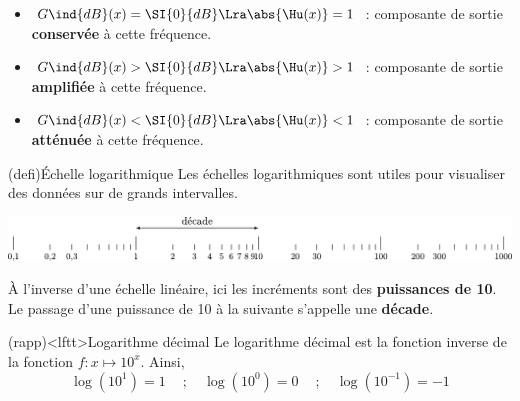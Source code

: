 \documentclass[../../main/main.tex]{subfiles}
\begin{document}
\begin{tcb*}[breakable]
\begin{enumerate}
		      \begin{itemize}
			      \item $G\ind{dB}(x) = \SI{0}{dB} \Lra \abs{\Hu(x)} = 1$~: composante
			            de sortie \textbf{conservée} à cette fréquence.
			      \item $G\ind{dB}(x) > \SI{0}{dB} \Lra \abs{\Hu(x)} > 1$~: composante
			            de sortie \textbf{amplifiée} à cette fréquence.
			      \item $G\ind{dB}(x) < \SI{0}{dB} \Lra \abs{\Hu(x)} < 1$~: composante
			            de sortie \textbf{atténuée} à cette fréquence.
		      \end{itemize}
	\end{enumerate}
\end{tcb*}

\vspace{-10pt}
\begin{tcb}(defi){Échelle logarithmique}
	Les échelles logarithmiques sont utiles pour visualiser des données
	sur de grands intervalles.
	\smallbreak
	\noindent
	\begin{minipage}{\linewidth}
		\centering
		\includegraphics[width=\linewidth]{logscale}
		\label{fig:logscale}
	\end{minipage}
	À l'inverse d'une échelle linéaire, ici les incréments sont des
	\textbf{puissances de 10}. Le passage d'une puissance de 10 à la suivante
	s'appelle une \textbf{décade}.
\end{tcb}

\begin{tcb}(rapp)<lftt>{Logarithme décimal}
	Le logarithme décimal est la fonction inverse de la fonction $f:x\mapsto
		10^{x}$. Ainsi,
	\[
		\log(10^{1}) = 1
		\quad~; \quad
		\log (10^{0}) = 0
		\quad~; \quad
		\log (10^{-1}) = -1
	\]
\end{tcb}
\end{document}
